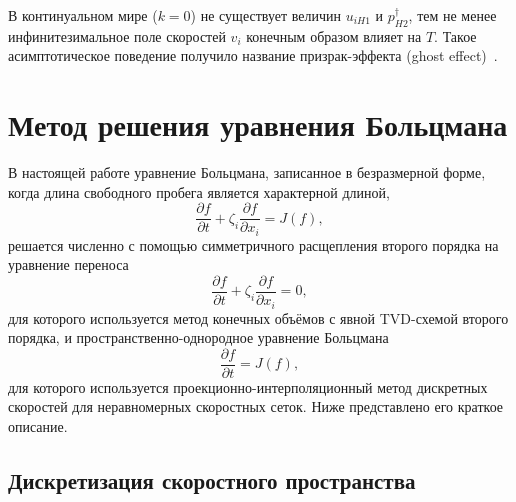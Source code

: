 \documentclass[
aps,%
12pt,%
final,%
notitlepage,%
oneside,%
onecolumn,%
nobibnotes,%
nofootinbib,%
superscriptaddress,%
noshowpacs,%
showkeys,%
floatfix,%
tightenlines,%
centertags]%
{revtex4}
\newcommand{\pder}[2][]{\frac{\partial#1}{\partial#2}}
\begin{document}
В континуальном мире (\(k=0\)) не существует величин \(u_{iH1}\) и \(p^\dag_{H2}\),
тем не менее инфинитезимальное поле скоростей \(v_i\) конечным образом влияет на \(T\).
Такое асимптотическое поведение получило название призрак-эффекта (ghost effect)~\cite{Sone2002, Sone2007}.

\section{Метод решения уравнения Больцмана}

В настоящей работе уравнение Больцмана, записанное в безразмерной форме,
когда длина свободного пробега является характерной длиной,
\begin{equation}\label{eq:Boltzmann_equation2}
    \pder[f]{t} + \zeta_i\pder[f]{x_i} = J(f),
\end{equation}
решается численно с помощью симметричного расщепления второго порядка на уравнение переноса
\begin{equation}\label{eq:split_transport}
    \pder[f]{t} + \zeta_i\pder[f]{x_i} = 0,
\end{equation}
для которого используется метод конечных объёмов с явной TVD-схемой второго порядка,
и пространственно-однородное уравнение Больцмана
\begin{equation}\label{eq:split_collisions}
    \pder[f]{t} = J(f),
\end{equation}
для которого используется проекционно-интерполяционный
метод дискретных скоростей для неравномерных скоростных сеток.
Ниже представлено его краткое описание.

\subsection{Дискретизация скоростного пространства}
\end{document}
